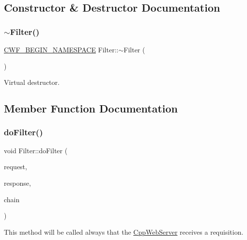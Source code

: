 \subsection{Constructor \& Destructor Documentation}
\mbox{\label{class_filter_ae68b45ae28ac3f31414f56ca8eda6d45}} 
\subsubsection{\texorpdfstring{$\sim$\+Filter()}{~Filter()}}
{\footnotesize\ttfamily \hyperlink{cppwebframework__global_8h_a7492e9498cbaf9cd17dbc2215d3a0e48}{C\+W\+F\+\_\+\+B\+E\+G\+I\+N\+\_\+\+N\+A\+M\+E\+S\+P\+A\+CE} Filter\+::$\sim$\+Filter (\begin{DoxyParamCaption}{ }\end{DoxyParamCaption})\hspace{0.3cm}{\ttfamily [virtual]}}



Virtual destructor. 



\subsection{Member Function Documentation}
\mbox{\label{class_filter_a4a863b3503070987e9584201973e37a3}} 
\subsubsection{\texorpdfstring{do\+Filter()}{doFilter()}}
{\footnotesize\ttfamily void Filter\+::do\+Filter (\begin{DoxyParamCaption}\item[{C\+W\+F\+::\+Http\+Servlet\+Request \&}]{request,  }\item[{C\+W\+F\+::\+Http\+Servlet\+Response \&}]{response,  }\item[{\hyperlink{class_filter_chain}{Filter\+Chain} \&}]{chain }\end{DoxyParamCaption})\hspace{0.3cm}{\ttfamily [virtual]}}



This method will be called always that the \hyperlink{class_cpp_web_server}{Cpp\+Web\+Server} receives a requisition. 


